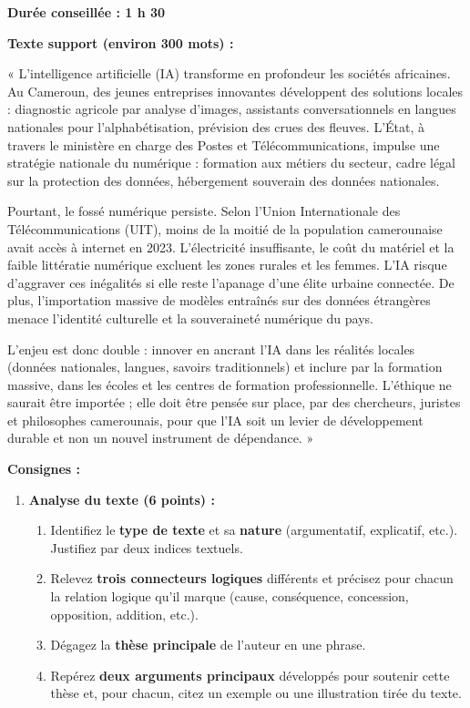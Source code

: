 \documentclass[11pt]{article}
\begin{document}
\begin{exercice}
\textbf{Durée conseillée : 1 h 30}

\textbf{Texte support (environ 300 mots) :}

\begin{itshape}« L'intelligence artificielle (IA) transforme en profondeur les sociétés africaines. Au Cameroun, des jeunes entreprises innovantes développent des solutions locales : diagnostic agricole par analyse d'images, assistants conversationnels en langues nationales pour l'alphabétisation, prévision des crues des fleuves. L'État, à travers le ministère en charge des Postes et Télécommunications, impulse une stratégie nationale du numérique : formation aux métiers du secteur, cadre légal sur la protection des données, hébergement souverain des données nationales.

Pourtant, le fossé numérique persiste. Selon l'Union Internationale des Télécommunications (UIT), moins de la moitié de la population camerounaise avait accès à internet en 2023. L'électricité insuffisante, le coût du matériel et la faible littératie numérique excluent les zones rurales et les femmes. L'IA risque d'aggraver ces inégalités si elle reste l'apanage d'une élite urbaine connectée. De plus, l'importation massive de modèles entraînés sur des données étrangères menace l'identité culturelle et la souveraineté numérique du pays.

L'enjeu est donc double : innover en ancrant l'IA dans les réalités locales (données nationales, langues, savoirs traditionnels) et inclure par la formation massive, dans les écoles et les centres de formation professionnelle. L'éthique ne saurait être importée ; elle doit être pensée sur place, par des chercheurs, juristes et philosophes camerounais, pour que l'IA soit un levier de développement durable et non un nouvel instrument de dépendance. »\end{itshape}

\textbf{Consignes :}
\begin{enumerate}
\item \textbf{Analyse du texte (6 points) :}
\begin{enumerate}
\item Identifiez le \textbf{type de texte} et sa \textbf{nature} (argumentatif, explicatif, etc.). Justifiez par deux indices textuels.
\item Relevez \textbf{trois connecteurs logiques} différents et précisez pour chacun la relation logique qu'il marque (cause, conséquence, concession, opposition, addition, etc.).
\item Dégagez la \textbf{thèse principale} de l'auteur en une phrase.
\item Repérez \textbf{deux arguments principaux} développés pour soutenir cette thèse et, pour chacun, citez un exemple ou une illustration tirée du texte.
\end{enumerate}


\end{enumerate}
\end{exercice}
\end{document}
